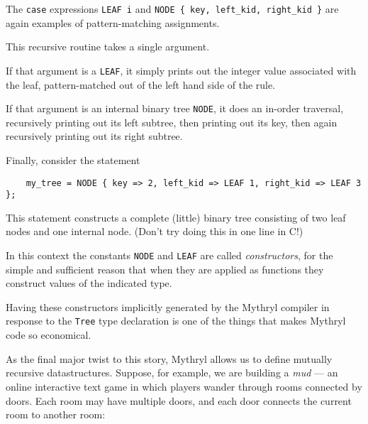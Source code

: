 The {\tt case} expressions 
{\tt LEAF i} and {\tt NODE \{ key, left\_kid, right\_kid \}} 
are again examples of pattern-matching assignments.

This recursive routine takes a single argument.

If that argument is a {\tt LEAF}, it simply prints out the integer 
value associated with the leaf, pattern-matched out of the 
left hand side of the rule.

If that argument is an internal binary tree {\tt NODE}, it does 
an in-order traversal, recursively printing out its left 
subtree, then printing out its key, then again 
recursively printing out its right subtree.

Finally, consider the statement

\begin{verbatim}
    my_tree = NODE { key => 2, left_kid => LEAF 1, right_kid => LEAF 3 };
\end{verbatim}

This statement constructs a complete (little) binary tree consisting of 
two leaf nodes and one internal node.  (Don't try doing this in one 
line in C!)

In this context the constants {\tt NODE} and {\tt LEAF} are called 
{\it constructors}, for the simple and sufficient reason that when 
they are applied as functions they construct values 
of the indicated type.

Having these constructors implicitly generated by the Mythryl compiler 
in response to the {\tt Tree} type declaration is one of the things 
that makes Mythryl code so economical.

As the final major twist to this story, Mythryl allows us to define 
mutually recursive datastructures.  Suppose, for example, we are 
building a {\it mud} --- an online interactive text game in which players 
wander through rooms connected by doors.  Each room may have 
multiple doors, and each door connects the current room to 
another room:

